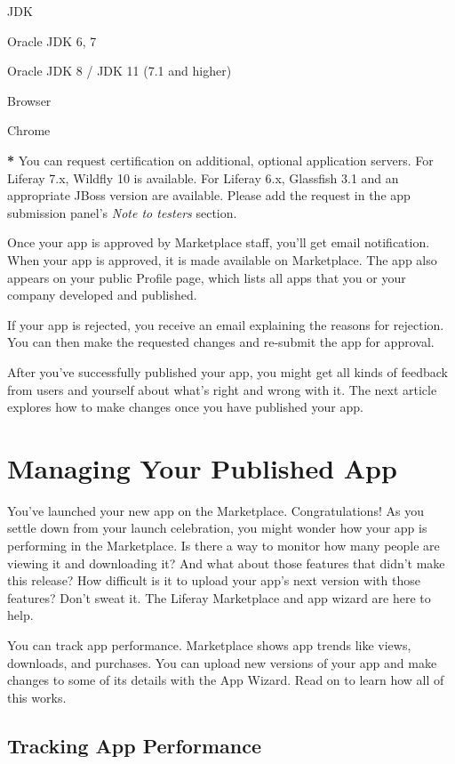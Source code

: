 JDK

Oracle JDK 6, 7

Oracle JDK 8 / JDK 11 (7.1 and higher)

Browser

Chrome

\textbf{*} You can request certification on additional, optional
application servers. For Liferay 7.x, Wildfly 10 is available. For
Liferay 6.x, Glassfish 3.1 and an appropriate JBoss version are
available. Please add the request in the app submission panel's
\emph{Note to testers} section.

Once your app is approved by Marketplace staff, you'll get email
notification. When your app is approved, it is made available on
Marketplace. The app also appears on your public Profile page, which
lists all apps that you or your company developed and published.

If your app is rejected, you receive an email explaining the reasons for
rejection. You can then make the requested changes and re-submit the app
for approval.

After you've successfully published your app, you might get all kinds of
feedback from users and yourself about what's right and wrong with it.
The next article explores how to make changes once you have published
your app.

\chapter{Managing Your Published App}\label{managing-your-published-app}

You've launched your new app on the Marketplace. Congratulations! As you
settle down from your launch celebration, you might wonder how your app
is performing in the Marketplace. Is there a way to monitor how many
people are viewing it and downloading it? And what about those features
that didn't make this release? How difficult is it to upload your app's
next version with those features? Don't sweat it. The Liferay
Marketplace and app wizard are here to help.

You can track app performance. Marketplace shows app trends like views,
downloads, and purchases. You can upload new versions of your app and
make changes to some of its details with the App Wizard. Read on to
learn how all of this works.

\section{Tracking App Performance}\label{tracking-app-performance}

